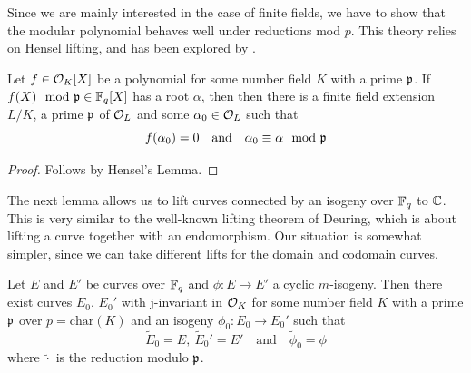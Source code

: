 Since we are mainly interested in the case of finite fields, we have to show that the modular polynomial behaves well under reductions mod $p$.
This theory relies on Hensel lifting, and has been explored by \cite{deuring_endomorphism_rings}.
\begin{lemma}
    \label{prop:modified_hensel_lifting}
    Let $f \in \mathcal{O}_K[X]$ be a polynomial for some number field $K$ with a prime $\mathfrak{p}$.
    If $f(X) \mod {\mathfrak{p}} \in \mathbb{F}_q[X]$ has a root $\alpha$, then then there is a finite field extension $L/K$, a prime $\mathfrak{p}$ of $\mathcal{O}_L$ and some $\alpha_0 \in \mathcal{O}_L$ such that
    \begin{equation*}
        f(\alpha_0) = 0 \quad \text{and} \quad \alpha_0 \equiv \alpha \mod {\mathfrak{p}}
    \end{equation*}
\end{lemma}
\begin{proof}
    Follows by Hensel's Lemma.
\end{proof}
The next lemma allows us to lift curves connected by an isogeny over $\mathbb{F}_q$ to $\mathbb{C}$.
This is very similar to the well-known lifting theorem of Deuring, which is about lifting a curve together with an endomorphism.
Our situation is somewhat simpler, since we can take different lifts for the domain and codomain curves.
\begin{lemma}
    Let $E$ and $E'$ be curves over $\mathbb{F}_q$ and $\phi: E \to E'$ a cyclic $m$-isogeny.
    Then there exist curves $E_0$, $E_0'$ with j-invariant in $\mathcal{O}_K$ for some number field $K$ with a prime $\mathfrak{p}$ over $p = \mathrm{char}(K)$ and an isogeny $\phi_0: E_0 \to E_0'$ such that
    \begin{equation*}
        \tilde{E}_0 = E, \ \tilde{E}_0' = E' \quad \text{and} \quad \tilde{\phi}_0 = \phi
    \end{equation*}
    where $\tilde{\cdot}$ is the reduction modulo $\mathfrak{p}$.
\end{lemma}
